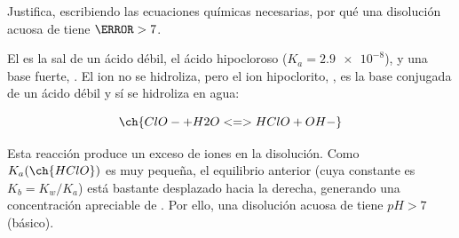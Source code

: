 \begin{exerciseEVAU}
    Justifica, escribiendo las ecuaciones químicas necesarias, por qué una disolución acuosa de  tiene \(\pH > 7\).




    \begin{solu}


        El  es la sal de un ácido débil, el ácido hipocloroso  (\(K_a = \num{2.9e-8}\)), y una base fuerte, . El ion  no se hidroliza, pero el ion hipoclorito, , es la base conjugada de un ácido débil y sí se hidroliza en agua:

        \begin{equation*}
            \ch{ClO- + H2O <=> HClO + OH-}
        \end{equation*}

        Esta reacción produce un exceso de iones  en la disolución. Como \(K_a(\ch{HClO})\) es muy pequeña, el equilibrio anterior (cuya constante es \(K_b = K_w/K_a\)) está bastante desplazado hacia la derecha, generando una concentración apreciable de . Por ello, una disolución acuosa de  tiene \(pH > 7\) (básico).

    \end{solu}
\end{exerciseEVAU}
